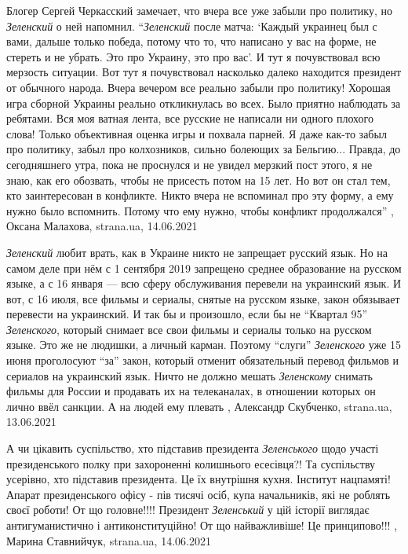 Блогер Сергей Черкасский замечает, что вчера все уже забыли про политику, но
\emph{Зеленский} о ней напомнил. \enquote{\emph{Зеленский} после матча: 
\enquote{Каждый украинец был с вами,
дальше только победа, потому что то, что написано у вас на форме, не стереть и
не убрать. Это про Украину, это про вас}.  И тут я почувствовал всю мерзость
ситуации. Вот тут я почувствовал насколько далеко находится президент от
обычного народа.  Вчера вечером все реально забыли про политику! Хорошая игра
сборной Украины реально откликнулась во всех. Было приятно наблюдать за
ребятами. Вся моя ватная лента, все русские не написали ни одного плохого
слова! Только объективная оценка игры и похвала парней.  Я даже как-то забыл
про политику, забыл про колхозников, сильно болеющих за Бельгию... Правда, до
сегодняшнего утра, пока не проснулся и не увидел мерзкий пост этого, я не знаю,
как его обозвать, чтобы не присесть потом на 15 лет.  Но вот он стал тем, кто
заинтересован в конфликте. Никто вчера не вспоминал про эту форму, а ему нужно
было вспомнить.  Потому что ему нужно, чтобы конфликт продолжался}
, 
Оксана Малахова, strana.ua, 14.06.2021

\emph{Зеленский} любит врать, как в Украине никто не запрещает русский язык. Но на
самом деле при нём с 1 сентября 2019 запрещено среднее образование на русском
языке, а с 16 января — всю сферу обслуживания перевели на украинский язык.  И
вот, с 16 июля, все фильмы и сериалы, снятые на русском языке, закон обязывает
перевести на украинский. И так бы и произошло, если бы не \enquote{Квартал 95}
\emph{Зеленского}, который снимает все свои фильмы и сериалы только на русском языке.
Это же не людишки, а личный карман.  Поэтому \enquote{слуги} \emph{Зеленского} уже 15 июня
проголосуют \enquote{за} закон, который отменит обязательный перевод фильмов и сериалов
на украинский язык. Ничто не должно мешать \emph{Зеленскому} снимать фильмы для России
и продавать их на телеканалах, в отношении которых он лично ввёл санкции. А на
людей ему плевать
, 
Александр Скубченко, strana.ua, 13.06.2021

А чи цікавить суспільство, хто підставив президента \emph{Зеленського} щодо участі
президенського полку при захороненні колишнього есесівця?! Та суспільству
усерівно, хто підставив президента. Це їх внутрішня кухня. Інститут нацпамяті!
Апарат президенського офісу - пів тисячі осіб, купа начальників, які не роблять
своєї роботи! От що головне!!!! Президент \emph{Зеленський} у цій історії виглядає
антигуманистично і антиконституційно! От що найважливіше! Це принципово!!!
, 
Марина Ставнийчук, strana.ua, 14.06.2021

